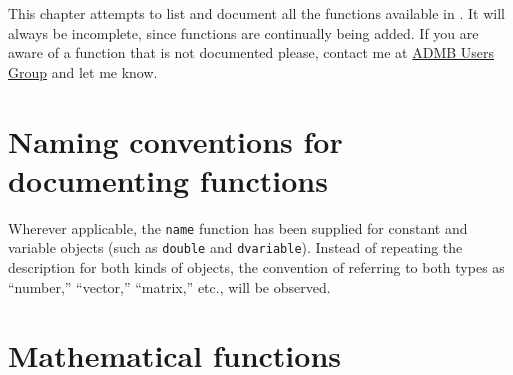 %
%

This chapter attempts to list and document all the functions
available in \ADM. It will always be incomplete, since functions are
continually being added. If you are aware of a function that is
not documented please, contact me at \href{mailto:users@admb-project.org}{ADMB Users Group} and
let me know.


\section{Naming conventions for documenting functions}

Wherever applicable, the \texttt{name} function has been supplied for
constant and variable objects (such as \texttt{double} and \texttt{dvariable}).
Instead of repeating the description for both kinds of objects,
the convention of referring to both types as ``number,'' ``vector,''
``matrix,'' etc., will be observed.


\section{Mathematical functions}

